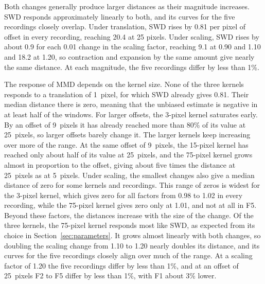 Both changes generally produce larger distances as their magnitude increases. SWD responds approximately linearly to both, and its curves for the five recordings closely overlap. Under translation, SWD rises by 0.81 per pixel of offset in every recording, reaching 20.4 at 25 pixels. Under scaling, SWD rises by about 0.9 for each 0.01 change in the scaling factor, reaching 9.1 at 0.90 and 1.10 and 18.2 at 1.20, so contraction and expansion by the same amount give nearly the same distance. At each magnitude, the five recordings differ by less than 1\%.

The response of MMD depends on the kernel size. None of the three kernels responds to a translation of 1~pixel, for which SWD already gives 0.81. Their median distance there is zero, meaning that the unbiased estimate is negative in at least half of the windows. For larger offsets, the 3-pixel kernel saturates early. By an offset of 9~pixels it has already reached more than 80\% of its value at 25~pixels, so larger offsets barely change it. The larger kernels keep increasing over more of the range. At the same offset of 9~pixels, the 15-pixel kernel has reached only about half of its value at 25~pixels, and the 75-pixel kernel grows almost in proportion to the offset, giving about five times the distance at 25~pixels as at 5~pixels. Under scaling, the smallest changes also give a median distance of zero for some kernels and recordings. This range of zeros is widest for the 3-pixel kernel, which gives zero for all factors from 0.98 to 1.02 in every recording, while the 75-pixel kernel gives zero only at 1.01, and not at all in F5. Beyond these factors, the distances increase with the size of the change. Of the three kernels, the 75-pixel kernel responds most like SWD, as expected from its choice in Section~\ref{sec:parameters}. It grows almost linearly with both changes, so doubling the scaling change from 1.10 to 1.20 nearly doubles its distance, and its curves for the five recordings closely align over much of the range. At a scaling factor of 1.20 the five recordings differ by less than 1\%, and at an offset of 25~pixels F2 to F5 differ by less than 1\%, with F1 about 3\% lower.

